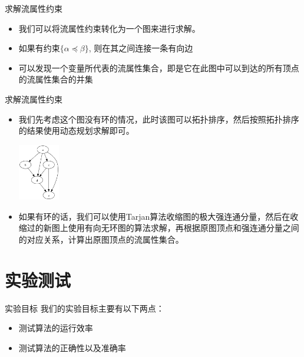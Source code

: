 \documentclass[9pt]{beamer}
\begin{document}
\begin{frame}[fragile]{求解流属性约束}
	\begin{itemize}
		\item 我们可以将流属性约束转化为一个图来进行求解。
		\vspace{0.3em}
		\item 如果有约束$\{\alpha\preceq\beta\}$, 则在其之间连接一条有向边
		\vspace{0.3em}
		\item 可以发现一个变量所代表的流属性集合，即是它在此图中可以到达的所有顶点的流属性集合的并集
	\end{itemize}
\end{frame}

\begin{frame}[fragile]{求解流属性约束}
	\begin{itemize}
		\item 我们先考虑这个图没有环的情况，此时该图可以拓扑排序，然后按照拓扑排序的结果使用动态规划求解即可。
		\vspace{0.5em}
		\begin{center}
	\includegraphics[width=1.8cm]{DAG.png}
	\end{center}
		\vspace{0.2em}
		\item 如果有环的话，我们可以使用Tarjan算法收缩图的极大强连通分量，然后在收缩过的新图上使用有向无环图的算法求解，再根据原图顶点和强连通分量之间的对应关系，计算出原图顶点的流属性集合。
	\end{itemize}
\end{frame}

\section{实验测试}

\begin{frame}[fragile]{实验目标}
	我们的实验目标主要有以下两点：
	\vspace{0.5em}
	\begin{itemize}
		\item 测试算法的运行效率
		\vspace{0.3em}
		\item 测试算法的正确性以及准确率
	\end{itemize}
\end{frame}
\end{document}
